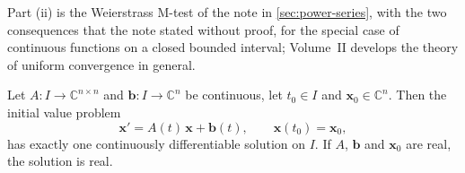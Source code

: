 Part (ii) is the Weierstrass M-test of the note in \cref{sec:power-series}, with the two consequences that the note stated without proof, for the special case of continuous functions on a closed bounded interval; Volume~II develops the theory of uniform convergence in general.

\begin{theorem}
\label{thm:linear-existence}
Let $A\colon I\to\mathbb C^{n\times n}$ and $\mathbf b\colon I\to\mathbb C^n$ be continuous, let $t_0\in I$ and $\mathbf x_0\in\mathbb C^n$. Then the initial value problem
\[
\mathbf x'=A(t)\,\mathbf x+\mathbf b(t),\qquad\mathbf x(t_0)=\mathbf x_0 ,
\]
has exactly one continuously differentiable solution on $I$. If $A$, $\mathbf b$ and $\mathbf x_0$ are real, the solution is real.
\end{theorem}

